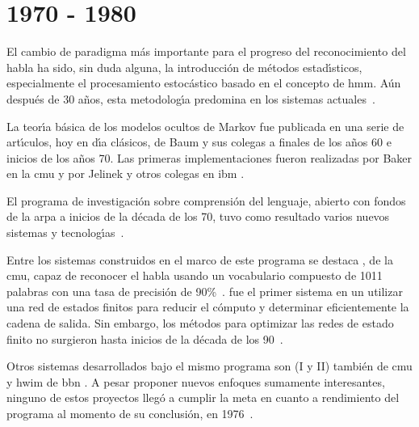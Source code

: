 \section{1970 - 1980}
\label{sec:70s}

El cambio de paradigma m\'as importante para el progreso del reconocimiento del habla ha sido, 
sin duda alguna, la introducci\'on de m\'etodos estad{\'\i}sticos, especialmente el procesamiento 
estoc\'astico basado en el concepto de \gls{hmm}. A\'un despu\'es de 30 a\~nos, esta metodolog{\'\i}a
predomina en los sistemas \mbox{actuales \cite{BakerResearch2009}}.

La teor{\'\i}a b\'asica de los modelos ocultos de Markov fue publicada en una serie de art{\'\i}culos, 
hoy en d{\'\i}a cl\'asicos, de Baum y sus colegas a finales de los a\~nos 60 e inicios de los a\~nos 70. 
Las primeras implementaciones fueron realizadas por Baker en la \gls{cmu} y por Jelinek y otros colegas
en \gls{ibm} \cite{Rabiner89atutorial}.

El programa de investigaci\'on sobre comprensi\'on del lenguaje, abierto con fondos de la \gls{arpa} 
a inicios de la d\'ecada de los 70, tuvo como resultado varios nuevos sistemas y 
\mbox{tecnolog{\'\i}as \cite{Furui50Years2004}}.

Entre los sistemas construidos en el marco de este programa se destaca , de la \gls{cmu},
capaz de reconocer el habla usando un vocabulario compuesto de 1011 palabras con una tasa de 
precisi\'on de \mbox{90\% \cite{Newell1978}.}  fue el primer sistema en un utilizar una 
red de estados finitos para reducir el c\'omputo y determinar eficientemente la cadena de salida. 
Sin embargo, los m\'etodos para optimizar las redes de estado finito no surgieron hasta inicios de
la d\'ecada de los \mbox{90 \cite{JuangAutomaticSpeech}}.

Otros sistemas desarrollados bajo el mismo programa son (I y II) tambi\'en de \gls{cmu} y 
\gls{hwim} de \gls{bbn} \cite{JuangAutomaticSpeech}. A pesar proponer nuevos enfoques sumamente 
interesantes, ninguno de estos proyectos lleg\'o a cumplir la meta en cuanto a rendimiento
del programa al momento de su conclusi\'on, en \mbox{1976 \cite{JuangAutomaticSpeech}}.
